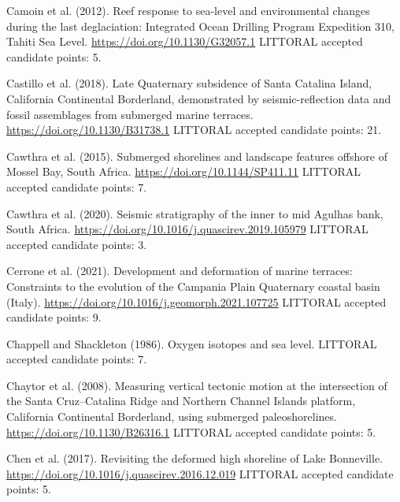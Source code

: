 \documentclass[twocolumn,10pt]{article}
\begin{document}
\begin{thebibliography}{}
Camoin et al. (2012).
\newblock Reef response to sea-level and environmental changes during the last deglaciation: Integrated Ocean Drilling Program Expedition 310, Tahiti Sea Level.
\newblock \url{https://doi.org/10.1130/G32057.1}
\newblock LITTORAL accepted candidate points: 5.

Castillo et al. (2018).
\newblock Late Quaternary subsidence of Santa Catalina Island, California Continental Borderland, demonstrated by seismic-reflection data and fossil assemblages from submerged marine terraces.
\newblock \url{https://doi.org/10.1130/B31738.1}
\newblock LITTORAL accepted candidate points: 21.

Cawthra et al. (2015).
\newblock Submerged shorelines and landscape features offshore of Mossel Bay, South Africa.
\newblock \url{https://doi.org/10.1144/SP411.11}
\newblock LITTORAL accepted candidate points: 7.

Cawthra et al. (2020).
\newblock Seismic stratigraphy of the inner to mid Agulhas bank, South Africa.
\newblock \url{https://doi.org/10.1016/j.quascirev.2019.105979}
\newblock LITTORAL accepted candidate points: 3.

Cerrone et al. (2021).
\newblock Development and deformation of marine terraces: Constraints to the evolution of the Campania Plain Quaternary coastal basin (Italy).
\newblock \url{https://doi.org/10.1016/j.geomorph.2021.107725}
\newblock LITTORAL accepted candidate points: 9.

Chappell and Shackleton (1986).
\newblock Oxygen isotopes and sea level.
\newblock LITTORAL accepted candidate points: 7.

Chaytor et al. (2008).
\newblock Measuring vertical tectonic motion at the intersection of the Santa Cruz–Catalina Ridge and Northern Channel Islands platform, California Continental Borderland, using submerged paleoshorelines.
\newblock \url{https://doi.org/10.1130/B26316.1}
\newblock LITTORAL accepted candidate points: 5.

Chen et al. (2017).
\newblock Revisiting the deformed high shoreline of Lake Bonneville.
\newblock \url{https://doi.org/10.1016/j.quascirev.2016.12.019}
\newblock LITTORAL accepted candidate points: 5.


\end{thebibliography}
\end{document}
